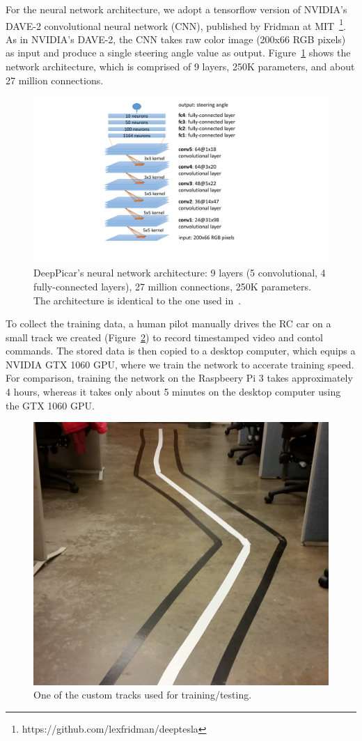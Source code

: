 For the neural network architecture, we adopt a tensorflow version of
NVIDIA's DAVE-2 convolutional neural network (CNN), published by
Fridman at  MIT~\footnote{https://github.com/lexfridman/deeptesla}. As
in NVIDIA's DAVE-2, the CNN takes raw color image (200x66 RGB pixels)
as input and produce a single steering angle value as
output. Figure~\ref{fig:architecture} shows the network architecture, which
is comprised of 9 layers, 250K parameters, and about 27 million
connections.

\begin{figure}[h]
  \centering
  \includegraphics[width=.4\textwidth]{figs/architecture}
  \caption{DeepPicar's neural network architecture: 9 layers (5
    convolutional, 4 fully-connected layers), 27 million connections,
    250K parameters. The architecture is identical to the one used
    in~\cite{Bojarski2016}.}
  \label{fig:architecture}
\end{figure}

To collect the training data, a human pilot manually drives the RC car
on a small track we created (Figure~\ref{fig:track}) to record
timestamped video and contol commands. The stored data is then copied 
to a desktop computer, which equips a NVIDIA GTX 1060 GPU, where we
train the network to accerate training speed. 
For comparison, training the network on the Raspbeery Pi 3 takes
approximately 4 hours, whereas it takes only about 5 minutes on the
desktop computer using the GTX 1060 GPU.

\begin{figure}[h]
  \centering
  \includegraphics[width=.4\textwidth]{figs/track_new2}
  \caption{One of the custom tracks used for training/testing.}
  \label{fig:track}
\end{figure}


